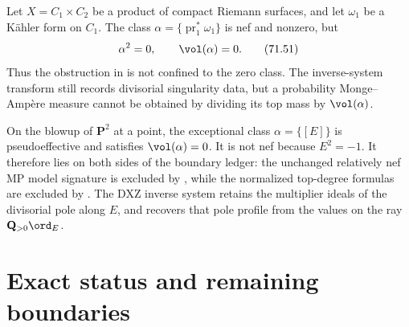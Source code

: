 \begin{example}
\label{ex:pseff-nef-zero-volume}
Let $X=C_1\times C_2$ be a product of compact Riemann surfaces, and let
$\omega_1$ be a K\"ahler form on $C_1$.  The class
$\alpha=\{\operatorname{pr}_1^*\omega_1\}$ is nef and nonzero, but
\[
                 \alpha^2=0,
                 \qquad \vol(\alpha)=0.
\tag{71.51}\label{eq:pseff-product-zero-volume}
\]
Thus the obstruction in
 is not confined to the zero class.
The inverse-system transform still records divisorial singularity data,
but a probability Monge--Amp\`ere measure cannot be obtained by dividing
its top mass by $\vol(\alpha)$.
\end{example}

\begin{example}
\label{ex:pseff-exceptional-zero-volume}
On the blowup of $\mathbf P^2$ at a point, the exceptional class
$\alpha=\{[E]\}$ is pseudoeffective and satisfies
$\vol(\alpha)=0$.  It is not nef because $E^2=-1$.  It therefore lies
on both sides of the boundary ledger: the unchanged relatively nef MP
model signature is excluded by
, while the normalized
top-degree formulas are excluded by
.  The DXZ inverse system retains
the multiplier ideals of the divisorial pole along $E$, and
 recovers that pole profile from the
values on the ray $\mathbf Q_{>0}\ord_E$.
\end{example}

\section{Exact status and remaining boundaries}
\label{sec:pseff-status}

